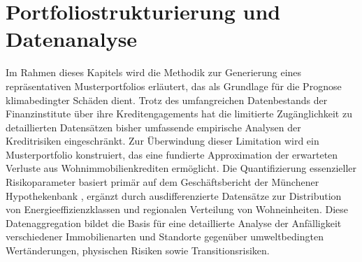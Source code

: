 \section{Portfoliostrukturierung und Datenanalyse}

Im Rahmen dieses Kapitels wird die Methodik zur Generierung eines repräsentativen Musterportfolios erläutert, das als Grundlage für die Prognose klimabedingter Schäden dient. Trotz des umfangreichen Datenbestands der Finanzinstitute über ihre Kreditengagements hat die limitierte Zugänglichkeit zu detaillierten Datensätzen bisher umfassende empirische Analysen der Kreditrisiken eingeschränkt. Zur Überwindung dieser Limitation wird ein Musterportfolio konstruiert, das eine fundierte Approximation der erwarteten Verluste aus Wohnimmobilienkrediten ermöglicht. Die Quantifizierung essenzieller Risikoparameter basiert primär auf dem Geschäftsbericht der Münchener Hypothekenbank \parencite{MuenchenerHyp2023}, ergänzt durch ausdifferenzierte Datensätze zur Distribution von Energieeffizienzklassen und regionalen Verteilung von Wohneinheiten. Diese Datenaggregation bildet die Basis für eine detaillierte Analyse der Anfälligkeit verschiedener Immobilienarten und Standorte gegenüber umweltbedingten Wertänderungen, physischen Risiken sowie Transitionsrisiken. 








